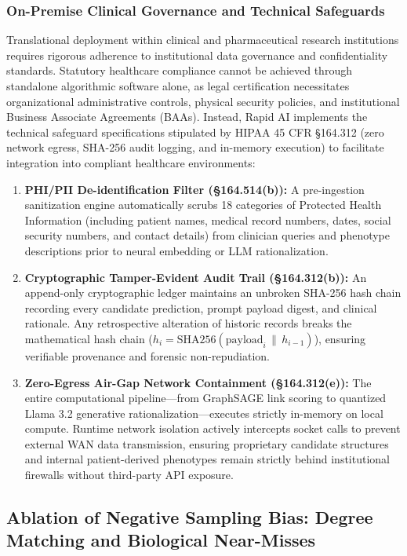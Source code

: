 \documentclass[preprint,12pt]{elsarticle}
\begin{document}
\subsubsection{On-Premise Clinical Governance and Technical Safeguards}
Translational deployment within clinical and pharmaceutical research institutions requires rigorous adherence to institutional data governance and confidentiality standards. Statutory healthcare compliance cannot be achieved through standalone algorithmic software alone, as legal certification necessitates organizational administrative controls, physical security policies, and institutional Business Associate Agreements (BAAs). Instead, Rapid AI implements the technical safeguard specifications stipulated by HIPAA 45 CFR \S 164.312 (zero network egress, SHA-256 audit logging, and in-memory execution) to facilitate integration into compliant healthcare environments:
\begin{enumerate}
    \item \textbf{PHI/PII De-identification Filter (\S 164.514(b)):} A pre-ingestion sanitization engine automatically scrubs 18 categories of Protected Health Information (including patient names, medical record numbers, dates, social security numbers, and contact details) from clinician queries and phenotype descriptions prior to neural embedding or LLM rationalization.
    \item \textbf{Cryptographic Tamper-Evident Audit Trail (\S 164.312(b)):} An append-only cryptographic ledger maintains an unbroken SHA-256 hash chain recording every candidate prediction, prompt payload digest, and clinical rationale. Any retrospective alteration of historic records breaks the mathematical hash chain ($h_i = \mathrm{SHA256}(\text{payload}_i \,\|\, h_{i-1})$), ensuring verifiable provenance and forensic non-repudiation.
    \item \textbf{Zero-Egress Air-Gap Network Containment (\S 164.312(e)):} The entire computational pipeline—from GraphSAGE link scoring to quantized Llama 3.2 generative rationalization—executes strictly in-memory on local compute. Runtime network isolation actively intercepts socket calls to prevent external WAN data transmission, ensuring proprietary candidate structures and internal patient-derived phenotypes remain strictly behind institutional firewalls without third-party API exposure.
\end{enumerate}

\subsection{Ablation of Negative Sampling Bias: Degree Matching and Biological Near-Misses}
\label{sec:hard_negatives}
\end{document}
